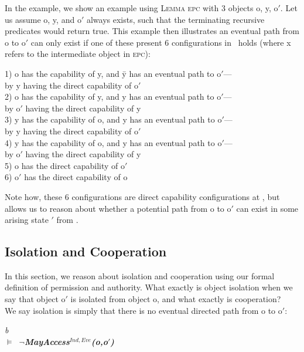 \documentclass[a4paper,11pt,twoside]{article}
\makeatletter
\newenvironment{logic}
{\begin{minipage}[c]{\linewidth}  \sffamily \mdseries \begin{tabbing}}
{\end{tabbing}\end{minipage}\vspace{0.3em}}
\newcommand{\losigma}{\text{$\upsigma$}}
\newcommand{\loturns} {$\vDash$}
\newcommand{\loneg}{$\boldsymbol \neg$}
\DeclareRobustCommand{\emp}{%
  \@nomath\em \if b\expandafter\@car\f@series\@nil
  \normalfont \else \sffamily \bfseries \fi}
\makeatother
\begin{document}
In the example, we show an example using \textsc{Lemma epc} with 3 objects o, y, o$'$. Let us assume o, y, and o$'$ always exists, such that the terminating recursive predicates would return true. This example then illustrates an eventual path from o to o$'$ can only exist if one of these present 6 configurations in \losigma\ holds (where x refers to the intermediate object in \textsc{epc}):
\begin{tabbing}
1) o has the capability of y, and \=y has an eventual path to o$'$---\\
\>by y having the direct capability of o$'$\\
2) o has the capability of y, and y has an eventual path to o$'$---\\
\>by o$'$ having the direct capability of y\\
3) y has the capability of o, and y has an eventual path to o$'$---\\
\>by y having the direct capability of o$'$\\
4) y has the capability of o, and y has an eventual path to o$'$---\\
\>by o$'$ having the direct capability of y\\
5) o has the direct capability of o$'$\\
6) o$'$ has the direct capability of o\\
\end{tabbing}
Note how, these 6 configurations are direct capability configurations at \losigma, but allows us to reason about whether a potential path from o to o$'$ can exist in some arising state \losigma$'$ from \losigma.\\

\subsection{Isolation and Cooperation}\label{sec:isolation and cooperation}
In this section, we reason about isolation and cooperation using our formal definition of permission and authority. What exactly is object isolation when we say that object o$'$ is isolated from object o, and what exactly is cooperation?\\

We say isolation is simply that there is no eventual directed path from o to o$'$:\\

\begin{logic}
\emp{Isolation of o$'$ from o:}\\
\loturns\ \loneg MayAccess$^{Ind,Eve}$(o,o$'$)\\
\end{logic}
\end{document}
